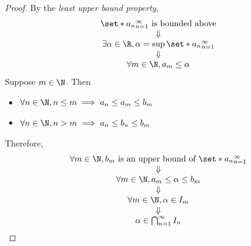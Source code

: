 \begin{proof}
  By the \emph{least upper bound property},
  \[
    \begin{array}{c}
      \set*{a_{n}}_{n = 1}^{\infty} \text{ is bounded above}             \\
      \Downarrow                                                         \\
      \exists \alpha \in \R, \alpha = \sup \set*{a_{n}}_{n = 1}^{\infty} \\
      \Downarrow                                                         \\
      \forall m \in \N, a_{m} \leq \alpha
    \end{array}
  \]
  Suppose $m \in \N$. Then
  \begin{itemize}
    \item $\forall n \in \N, n \leq m \implies a_{n} \leq a_{m} \leq b_{m}$
    \item $\forall n \in \N, n > m \implies a_{n} \leq b_{n} \leq b_{m}$
  \end{itemize}
  Therefore,
  \[
    \begin{array}{c}
      \forall m \in \N, b_{m} \text{ is an upper bound of } \set*{a_{n}}_{n = 1}^{\infty} \\
      \Downarrow                                                                          \\
      \forall m \in \N, a_{m} \leq \alpha \leq b_{m}                                      \\
      \Downarrow                                                                          \\
      \forall m \in \N, \alpha \in I_{m}                                                  \\
      \Downarrow                                                                          \\
      \alpha \in \bigcap_{n = 1}^{\infty} I_{n}
    \end{array}
  \]
\end{proof}

\bigskip

